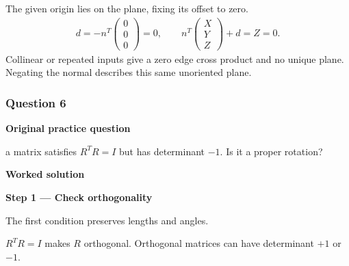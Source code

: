 \documentclass[letterpaper,11pt,english,openany,oneside]{jupyterBook}
\begin{document}
\sphinxAtStartPar
{} The given origin lies on the plane, fixing its offset to zero.
{\color{QuizMathBlue} \begin{equation*}
\begin{split}
d=-n^T\begin{pmatrix}0\\0\\0\end{pmatrix}=0,\qquad n^T\begin{pmatrix}X\\Y\\Z\end{pmatrix}+d=Z=0.
\end{split}
\end{equation*}}
\sphinxAtStartPar
Collinear or repeated inputs give a zero edge cross product and no unique plane. Negating the normal describes this same unoriented plane.

\par

\par\medskip


\subsubsection{Question 6}
\label{\detokenize{lectures/lecture01/tldr:question-6}}\label{\detokenize{lectures/lecture01/tldr:lec01-tldr-q6}}
\par\medskip\textbf{Original practice question}\par\smallskip

\sphinxAtStartPar
{} a matrix satisfies \(R^TR=I\) but has determinant \(-1\). Is it a proper rotation?

\par\medskip

\par\medskip
\textbf{Worked solution}\par\smallskip

\par\medskip{}
{\color{QuizStepRed}\bfseries Step 1 — Check orthogonality}\par\smallskip

\sphinxAtStartPar
{} The first condition preserves lengths and angles.

\sphinxAtStartPar
{\color{QuizMathBlue} \(R^TR=I\)} makes {\color{QuizMathBlue} \(R\)} orthogonal. Orthogonal matrices can have determinant {\color{QuizMathBlue} \(+1\)} or {\color{QuizMathBlue} \(-1\)}.
\end{document}

